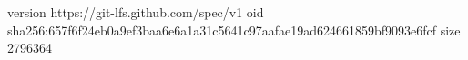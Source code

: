version https://git-lfs.github.com/spec/v1
oid sha256:657f6f24eb0a9ef3baa6e6a1a31c5641c97aafae19ad624661859bf9093e6fcf
size 2796364
